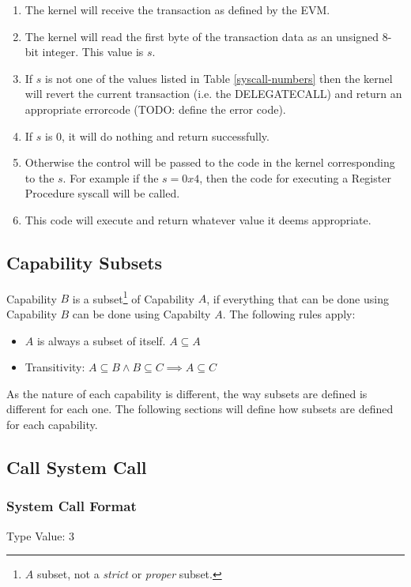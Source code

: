 \documentclass[english,a4paper]{article}
\let\oldparagraph\subsubsection
\renewcommand{\subsubsection}[1]{\oldparagraph{#1}\mbox{}}
\begin{document}
\begin{enumerate}
  \item The kernel will receive the transaction as defined by the EVM.
  \item The kernel will read the first byte of the transaction data as an
  unsigned 8-bit integer. This value is $s$.
  \item If $s$ is not one of the values listed in Table
  \ref{syscall-numbers} then the kernel will revert the current transaction
  (i.e. the DELEGATECALL) and return an appropriate errorcode (TODO: define the
  error code).
  \item If $s$ is 0, it will do nothing and return successfully.
  \item Otherwise the control will be passed to the code in the kernel
  corresponding to the $s$. For example if the $s = 0x4$, then the code for
  executing a Register Procedure syscall will be called.
  \item This code will execute and return whatever value it deems appropriate.
\end{enumerate}

\subsection{Capability Subsets}\label{cap-subsets}

Capability $B$ is a subset\footnote{$A$ subset, not a \emph{strict} or
\emph{proper} subset.} of Capability $A$, if everything that can be done using
Capability $B$ can be done using Capabilty $A$. The following rules apply:

\begin{itemize}
  \item $A$ is always a subset of itself. $A \subseteq A$
  \item Transitivity: $A \subseteq B \land B \subseteq C \implies A
  \subseteq C$
\end{itemize}

As the nature of each capability is different, the way subsets are defined is
different for each one. The following sections will define how subsets are
defined for each capability.

\subsection{Call System Call}

\subsubsection{System Call Format}
Type Value: 3
\end{document}
